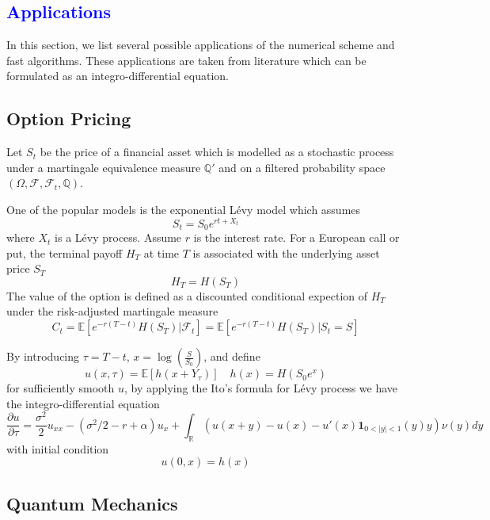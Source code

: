 \documentclass[10pt,a4paper]{article}
\newcommand{\RR}[0]{\mathbb{R}}
\newcommand{\lib}[1]{\subsection*{\textcolor{blue}{#1}}}
\theoremstyle{definition}
\begin{document}
\lib{Applications}

In this section, we list several possible applications of the numerical scheme and fast algorithms. These applications are taken from literature which can be formulated as an integro-differential equation.

\subsection{Option Pricing}

Let $S_t$ be the price of a financial asset which is modelled as a stochastic process under a martingale equivalence measure $\mathbb{Q}'$ and on a filtered probability space $(\Omega, \mathcal{F}, \mathcal{F}_t, \mathbb{Q})$.

One of the popular models is the exponential L\'evy model which assumes
\begin{equation}
	S_t = S_0 e^{rt+X_t}
\end{equation}
where $X_t$ is a L\'evy process. Assume $r$ is the interest rate. For a European call or put, the terminal payoff $H_T$ at time $T$ is associated with the underlying asset price $S_T$
\begin{equation}
	H_T = H(S_T)
\end{equation}
 The value of the option is defined as a discounted conditional expection of $H_T$ under the risk-adjusted martingale measure
\begin{equation}
	C_t = \mathbb{E}[e^{-r(T-t)}H(S_T)|\mathcal{F}_t] = \mathbb{E}[e^{-r(T-t)}H(S_T)|S_t=S]
\end{equation}

By introducing $\tau = T-t$, $x=\log\left( \frac{S}{S_0} \right)$, and define
\begin{equation}
	u(x,\tau) = \mathbb{E}[h(x+Y_\tau)]\quad h(x) = H(S_0 e^x)
\end{equation}
 for sufficiently smooth $u$, by applying the Ito's formula for L\'evy process we have the integro-differential equation
\begin{equation}
	\frac{\partial u}{\partial \tau} = \frac{\sigma^2}{2}u_{xx} - (\sigma^2/2-r+\alpha) u_x + \int_\RR (u(x+y)-u(x)-u'(x)\mathbf{1}_{0<|y|<1}(y)y)\nu(y)dy
\end{equation}
with initial condition
\begin{equation}
	u(0,x) = h(x)
\end{equation}


\subsection{Quantum Mechanics}
\end{document}
